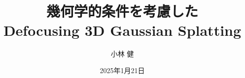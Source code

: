 \documentclass[draft]{jsarticle} %
\title{幾何学的条件を考慮した\\Defocusing 3D Gaussian Splatting}
\date{2025年1月21日}
\author{小林 健}
\newenvironment{heightchange}{%
	\setlength{\textheight}{680pt}
}%
\begin{document}
\maketitle
\thispagestyle{empty}%
\newpage

\thispagestyle{empty}%

\newpage

\pagestyle{fancy}
\rhead{}%
\lhead{\rightmark}%

\tableofcontents
\newpage

\listoffigures
\newpage

\listoftables
\newpage

\pagestyle{fancy}
\rhead{\rightmark}%
\lhead{\leftmark}%

 {chapter1}
\clearpage

 {chapter2}
\clearpage

 {chapter3}
\clearpage

 {chapter4}
\clearpage

 {chapter5}
\clearpage

\pagestyle{fancy}
\rhead{}%
\lhead{\rightmark}%
\clearpage

\begin{heightchange}
	\newpage
	\thispagestyle{empty}%
	
\end{heightchange}
\end{document}
